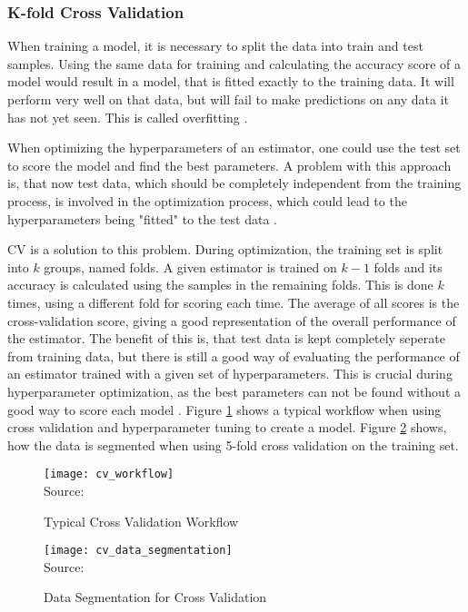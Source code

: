 \subsubsection{K-fold Cross Validation}

When training a model, it is necessary to split the data into train and test samples.
Using the same data for training and calculating the accuracy
score of a model would result in a model, that is fitted exactly to the training
data. It will perform very well on that data, but will fail to make predictions on any data
it has not yet seen. This is called overfitting \cite[7]{Raschka2018}.

When optimizing the hyperparameters of an estimator, one could use the test set to score
the model and find the best parameters. A problem with this approach is, that now test data,
which should be completely independent from the training process,
is involved in the optimization process, which could lead to the hyperparameters being
"fitted" to the test data \cite{scikit-cross-validation}.

\ac{CV} is a solution to this problem. During optimization, the training set is
split into $k$ groups, named folds. A given estimator is trained on $k-1$ folds and its accuracy
is calculated using the samples in the remaining folds. This is done $k$ times, using a different fold
for scoring each time. The average of all scores is the cross-validation score, giving a good
representation of the overall performance of the estimator.
The benefit of this is, that test data is kept completely seperate from training data, but there
is still a good way of evaluating the performance of an estimator trained with a given set
of hyperparameters. This is crucial during hyperparameter optimization, as the best parameters
can not be found without a good way to score each model \cite[p. 24f]{Raschka2018} \cite{scikit-cross-validation}.
Figure \ref{fig:cross validation workflow} shows a typical workflow when using cross validation
and hyperparameter tuning to create a model. Figure \ref{fig:cv data segmentation} shows,
how the data is segmented when using 5-fold cross validation on the training set.

\begin{figure}[H]
    \centering
    \caption{Typical Cross Validation Workflow}
	\label{fig:cross validation workflow}
    \texttt{[image: cv\_workflow]}
    \\
    Source: \cite{scikit-cross-validation}
\end{figure}

\begin{figure}[H]
    \centering
    \caption{Data Segmentation for Cross Validation}
	\label{fig:cv data segmentation}
    \texttt{[image: cv\_data\_segmentation]}
    \\
    Source: \cite{scikit-cross-validation}
\end{figure}